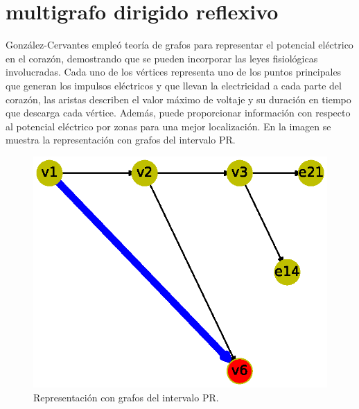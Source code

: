 \documentclass{article}
\begin{document}
\section{multigrafo dirigido reflexivo}
González-Cervantes \cite{gonzalez2016potencial} empleó teoría de grafos para representar el potencial eléctrico en el corazón, demostrando que se pueden incorporar las leyes fisiológicas involucradas. Cada uno de los vértices representa uno de los puntos principales que generan los impulsos eléctricos y que llevan la electricidad a cada parte del corazón, las aristas describen el valor máximo de voltaje y su
duración en tiempo que descarga cada vértice. Además, puede proporcionar información con respecto al potencial eléctrico por zonas para una mejor localización.
En la imagen se muestra la representación con grafos del intervalo PR.



\begin{figure}
  \centering 
  \includegraphics[width=.8\columnwidth]{12.eps}
  \caption{Representación con grafos del intervalo PR.}
  \label{fig:12}
\end{figure}


\newpage


\end{document}
